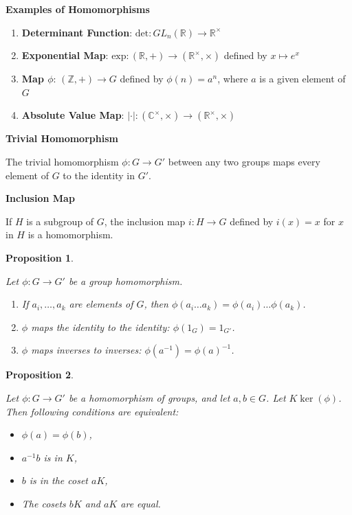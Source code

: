 \documentclass[
]{book}
\providecommand{\tightlist}{%
  \setlength{\itemsep}{0pt}\setlength{\parskip}{0pt}}
\newtheorem{proposition}{Proposition}[chapter]
\theoremstyle{definition}
\theoremstyle{definition}
\theoremstyle{definition}
\theoremstyle{definition}
\theoremstyle{remark}
\begin{document}
\textbf{Examples of Homomorphisms}

\begin{enumerate}
\def\labelenumi{\arabic{enumi}.}
\tightlist
\item
  \textbf{Determinant Function}: \(\text{det}: GL_n(\mathbb{R}) \to \mathbb{R}^\times\)
\item
  \textbf{Exponential Map}: \(\text{exp}: (\mathbb{R}, +) \to (\mathbb{R}^\times, \times)\) defined by \(x \mapsto e^x\)
\item
  \textbf{Map \(\phi\)}: \((\mathbb{Z}, +) \to G\) defined by \(\phi(n) = a^n\), where \(a\) is a given element of \(G\)
\item
  \textbf{Absolute Value Map}: \(|\cdot| : (\mathbb{C}^\times, \times) \to (\mathbb{R}^\times, \times)\)
\end{enumerate}

\textbf{Trivial Homomorphism}

The trivial homomorphism \(\phi: G \rightarrow G'\) between any two groups maps every element of \(G\) to the identity in \(G'\).

\textbf{Inclusion Map}

If \(H\) is a subgroup of \(G\), the inclusion map \(i: H \rightarrow G\) defined by \(i(x) = x\) for \(x\) in \(H\) is a homomorphism.

\begin{proposition}
\protect\hypertarget{prp:unnamed-chunk-24}{}\label{prp:unnamed-chunk-24}

Let \(\phi: G \rightarrow G'\) be a group homomorphism.

\begin{enumerate}
\def\labelenumi{(\alph{enumi})}
\item
  If \(a_i, \ldots, a_k\) are elements of \(G\), then \(\phi(a_i \ldots a_k) = \phi(a_i) \ldots \phi(a_k)\).
\item
  \(\phi\) maps the identity to the identity: \(\phi(1_G) = 1_{G'}\).
\item
  \(\phi\) maps inverses to inverses: \(\phi(a^{-1}) = \phi(a)^{-1}\).
\end{enumerate}

\end{proposition}

\begin{proposition}
\protect\hypertarget{prp:258}{}\label{prp:258}

Let \(\phi : G \rightarrow G'\) be a homomorphism of groups, and
let \(a,b\in G\). Let \(K\ker(\phi)\).
Then following conditions are equivalent:

\begin{itemize}
\tightlist
\item
  \(\phi(a) = \phi(b)\),\\
\item
  \(a^{-1}b\) is in \(K\),
\item
  \(b\) is in the coset \(aK\),
\item
  The cosets \(bK\) and \(aK\) are equal.
\end{itemize}

\end{proposition}
\end{document}
